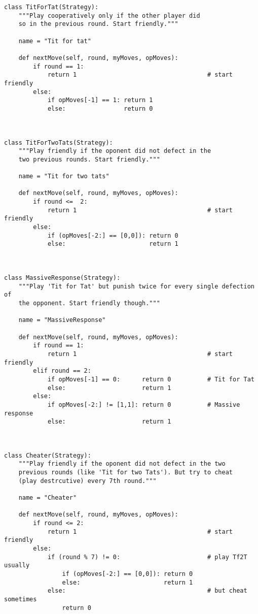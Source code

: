 \documentclass[12pt,a4paper,ngerman]{article}
\begin{document}
\begin{scriptsize}
\begin{verbatim}
class TitForTat(Strategy):
    """Play cooperatively only if the other player did 
    so in the previous round. Start friendly."""

    name = "Tit for tat"

    def nextMove(self, round, myMoves, opMoves):
        if round == 1:
            return 1                                    # start friendly
        else:
            if opMoves[-1] == 1: return 1
            else:                return 0



class TitForTwoTats(Strategy):
    """Play friendly if the oponent did not defect in the
    two previous rounds. Start friendly."""

    name = "Tit for two tats"

    def nextMove(self, round, myMoves, opMoves):
        if round <=  2:
            return 1                                    # start friendly
        else:
            if (opMoves[-2:] == [0,0]): return 0
            else:                       return 1



class MassiveResponse(Strategy):
    """Play 'Tit for Tat' but punish twice for every single defection of
    the opponent. Start friendly though."""

    name = "MassiveResponse"

    def nextMove(self, round, myMoves, opMoves):
        if round == 1:
            return 1                                    # start friendly
        elif round == 2:
            if opMoves[-1] == 0:      return 0          # Tit for Tat
            else:                     return 1
        else:
            if opMoves[-2:] != [1,1]: return 0          # Massive response
            else:                     return 1



class Cheater(Strategy):
    """Play friendly if the oponent did not defect in the two
    previous rounds (like 'Tit for two Tats'). But try to cheat
    (play destrcutive) every 7th round."""

    name = "Cheater"

    def nextMove(self, round, myMoves, opMoves):
        if round <= 2:
            return 1                                    # start friendly
        else:
            if (round % 7) != 0:                        # play Tf2T usually
                if (opMoves[-2:] == [0,0]): return 0
                else:                       return 1
            else:                                       # but cheat sometimes
                return 0




\end{verbatim}
\end{scriptsize}
\end{document}
